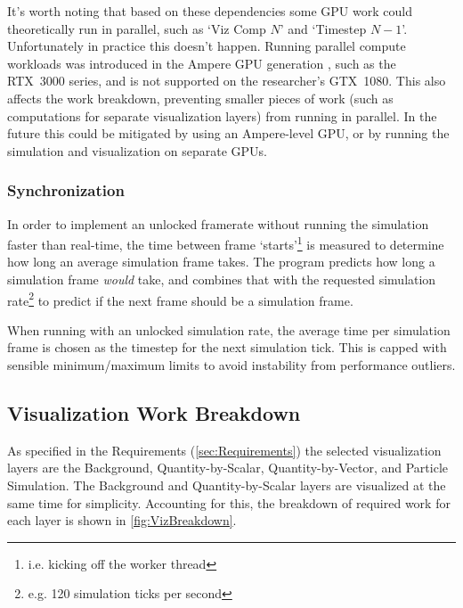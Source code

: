 It's worth noting that based on these dependencies some GPU work could theoretically run in parallel, such as `Viz Comp $N$' and `Timestep $N-1$'.
Unfortunately in practice this doesn't happen.
Running parallel compute workloads was introduced in the Ampere GPU generation \cite{nvidiaAmpereWhitepaper}, such as the RTX~3000 series, and is not supported on the researcher's GTX~1080.
This also affects the work breakdown, preventing smaller pieces of work (such as computations for separate visualization layers) from running in parallel.
In the future this could be mitigated by using an Ampere-level GPU, or by running the simulation and visualization on separate GPUs.

\subsubsection{Synchronization}
In order to implement an unlocked framerate without running the simulation faster than real-time, the time between frame `starts'\footnote{i.e. kicking off the worker thread} is measured to determine how long an average simulation frame takes. 
The program predicts how long a simulation frame \emph{would} take, and combines that with the requested simulation rate\footnote{e.g. 120 simulation ticks per second} to predict if the next frame should be a simulation frame.

When running with an unlocked simulation rate, the average time per simulation frame is chosen as the timestep for the next simulation tick.
This is capped with sensible minimum/maximum limits to avoid instability from performance outliers.

\subsection{Visualization Work Breakdown}\label{sec:Design:Viz:Breakdown}
As specified in the Requirements (\cref{sec:Requirements}) the selected visualization layers are the Background, Quantity-by-Scalar, Quantity-by-Vector, and Particle Simulation.
The Background and Quantity-by-Scalar layers are visualized at the same time for simplicity.
Accounting for this, the breakdown of required work for each layer is shown in \cref{fig:VizBreakdown}.

